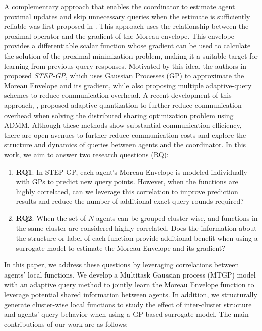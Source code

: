 \documentclass[conference]{IEEEtran}
\begin{document}
A complementary approach that enables the coordinator to estimate agent proximal updates and skip unnecessary queries when the estimate is sufficiently reliable was first proposed in \cite{stathopoulos2018communicationreductiondistributedoptimization}.  This approach uses the relationship between the proximal operator and the gradient of the Moreau envelope. 
This envelope provides a differentiable scalar function whose gradient can be used to calculate the solution of the proximal minimization problem, making it a suitable target for learning from previous query responses. 
Motivated by this idea, the authors in \cite{8635898, duarte2024optimal} proposed \textit{STEP-GP}, which uses Gaussian Processes (GP) to approximate the Moreau Envelope and its gradient, while also proposing multiple adaptive-query schemes to reduce communication overhead. A recent development of this approach, \cite{duarte2026communication}, proposed adaptive quantization to further reduce communication overhead when solving the distributed sharing optimization problem using ADMM. 
Although these methods show substantial communication efficiency, there are open avenues to further reduce communication costs and explore the structure and dynamics of queries between agents and the coordinator. In this work, we aim to answer two research questions (RQ):

\begin{enumerate}
     \item \textbf{RQ1}: In STEP-GP, each agent's Moreau Envelope is modeled individually with GPs to predict new query points. However, when the functions are highly correlated, can we leverage this correlation to improve prediction results and reduce the number of additional exact query rounds required?
     \item \textbf{RQ2}: When the set of $N$ agents can be grouped cluster-wise, and functions in the same cluster are considered highly correlated. Does the information about the structure or label of each function provide additional benefit when using a surrogate model to estimate the Moreau Envelope and its gradient?
\end{enumerate}

In this paper, we address these questions by leveraging correlations between agents' local functions. We develop a Multitask Gaussian process (MTGP) model with an adaptive query method to jointly learn the Moreau Envelope function to leverage potential shared information between agents. In addition, we structurally generate cluster-wise local functions to study the effect of inter-cluster structure and agents' query behavior when using a GP-based surrogate model. The main contributions of our work are as follows:
\end{document}
